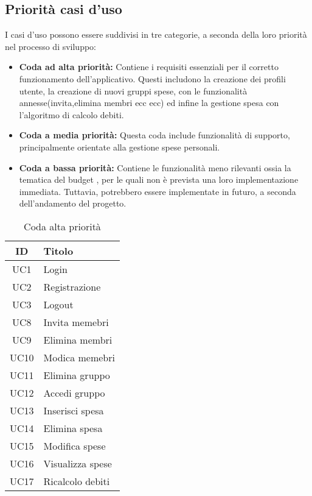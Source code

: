 \subsection{Priorità casi d'uso}
    I casi d'uso possono essere suddivisi in tre categorie, a seconda della loro priorità nel processo di sviluppo:
    \begin{itemize}
        \item \textbf{Coda ad alta priorità:} 
        Contiene i requisiti essenziali per il corretto funzionamento dell'applicativo. Questi includono la creazione dei profili utente, la creazione di nuovi gruppi spese, con le funzionalità annesse(invita,elimina membri ecc ecc) ed infine la gestione spesa con l'algoritmo di calcolo debiti.
    
        \item \textbf{Coda a media priorità:} 
        Questa coda include funzionalità di supporto, principalmente orientate alla gestione spese personali.
    
        \item \textbf{Coda a bassa priorità:} 
        Contiene le funzionalità meno rilevanti ossia la tematica del budget , per le quali non è prevista una loro implementazione immediata. Tuttavia, potrebbero essere implementate in futuro, a seconda dell'andamento del progetto.
    \end{itemize}

    \begin{table}[H]
        \centering
        \begin{tabular}{|c|l|}
        \hline
        \textbf{ID} & \textbf{Titolo} \\ \hline
        UC1 & Login\\ \hline
        UC2 & Registrazione \\ \hline
        UC3 & Logout \\ \hline
        UC8 & Invita memebri \\ \hline
        UC9 & Elimina membri \\ \hline
        UC10 & Modica memebri \\ \hline
        UC11 & Elimina gruppo \\ \hline
        UC12 & Accedi gruppo \\ \hline
        UC13 & Inserisci spesa \\ \hline
        UC14 & Elimina spesa \\ \hline
        UC15 & Modifica spese \\ \hline
        UC16 & Visualizza spese \\ \hline
        UC17 & Ricalcolo debiti \\ \hline
        \end{tabular}
        \caption{Coda alta priorità}
    \end{table}

